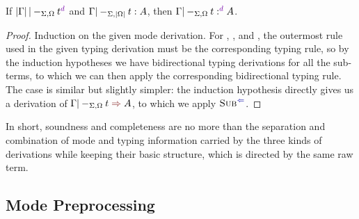 \begin{lemma}[Completeness]\label{thm:term-completeness}
If\/ $\erase\Gamma |-_{\Sigma, \Omega} t^\dir{d}$ and\/ $\Gamma |-_{\Sigma, \left|\Omega\right|} t : A$, then $\Gamma |-_{\Sigma, \Omega} t :^\dir{d} A$.
\end{lemma}

\begin{proof}
Induction on the given mode derivation.
For , , and , the outermost rule used in the given typing derivation must be the corresponding typing rule, so by the induction hypotheses we have bidirectional typing derivations for all the sub-terms, to which we can then apply the corresponding bidirectional typing rule.
The  case is similar but slightly simpler: the induction hypothesis directly gives us a derivation of $\Gamma |-_{\Sigma,\Omega} t \syn A$, to which we apply $\ChkRule{Sub}$.
\end{proof}

In short, soundness and completeness are no more than the separation and combination of mode and typing information carried by the three kinds of derivations while keeping their basic structure, which is directed by the same raw term.

\subsection{Mode Preprocessing}
\label{sec:mode-preprocessing}

\newcommand{\True}{\mathbf{T}}
\newcommand{\False}{\mathbf{F}}

